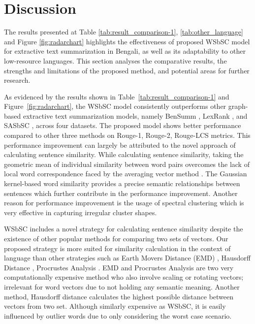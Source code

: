 \documentclass[acmlarge]{acmart}
\begin{document}
\section{Discussion}\label{sec:discussion}
The results presented at Table \ref{tab:result_comparison-1}, \ref{tab:other_language} and Figure \ref{fig:radarchart} highlights the effectiveness of proposed WSbSC model for extractive text summarization in Bengali, as well as its adaptability to other low-resource languages. This section analyses the comparative results, the strengths and limitations of the proposed method, and potential areas for further research.

As evidenced by the results shown in Table~\ref{tab:result_comparison-1} and Figure~\ref{fig:radarchart}, the WSbSC model consistently outperforms other graph-based extractive text summarization models, namely BenSumm \cite{das-2022-tfidf}, LexRank \cite{Erkan-lexRank-2004}, and SASbSC \cite{roychowdhury-etal-2022-spectral-base}, across four datasets. The proposed model shows better performance compared to other three methods on Rouge-1, Rouge-2, Rouge-LCS metrics. This performance improvement can largely be attributed to the novel approach of calculating sentence similarity. While calculating sentence similarity, taking the geometric mean of individual similarity between word pairs overcomes the lack of local word correspondence faced by the averaging vector method \cite{roychowdhury-etal-2022-spectral-base}. The Gaussian kernel-based word similarity provides a precise semantic relationships between sentences which further contribute in the performance improvement. Another reason for performance improvement is the usage of spectral clustering which is very effective in capturing irregular cluster shapes.

WSbSC includes a novel strategy for calculating sentence similarity despite the existence of other popular methods for comparing two sets of vectors. Our proposed strategy is more suited for similarity calculation in the context of language than other strategies such as Earth Movers Distance (EMD) \cite{Rubner-19998-emd}, Hausdorff Distance \cite{hausdorff-1914-hausdorff-distance}, Procrustes Analysis \cite{Gower-1975-procrustes-distance}. EMD \cite{Rubner-19998-emd} and Procrustes Analysis \cite{Gower-1975-procrustes-distance} are two very computationally expensive method who also involve scaling or rotating vectors; irrelevant for word vectors due to not holding any semantic meaning. Another method, Hausdorff distance \cite{hausdorff-1914-hausdorff-distance} calculates the highest possible distance between vectors from two set. Although similarly expensive as WSbSC, it is easily influenced by outlier words due to only considering the worst case scenario.
\end{document}
